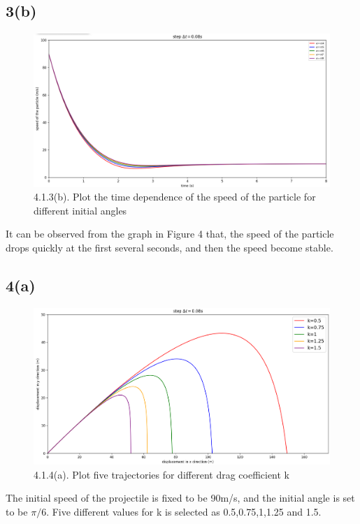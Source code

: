 \documentclass{article}
\begin{document}
\newpage
\subsection*{3(b)}
\begin{figure}[H]
  \centering
  \includegraphics[scale=0.4]{./graphs/project4.1.3(b).png}
  \caption{4.1.3(b). Plot the time dependence of the speed of the particle for different initial angles}
\end{figure}
It can be observed from the graph in Figure 4 that, the speed of the particle drops quickly at the first several seconds, and then the speed become stable.

\vspace{0.03\textheight}
\subsection*{4(a)}
\begin{figure}[H]
  \centering
  \includegraphics[scale=0.4]{./graphs/project4.1.4(a).png}
  \caption{4.1.4(a). Plot five trajectories for different drag coefficient k}
\end{figure}
\vspace{0.01\textheight}
The initial speed of the projectile is fixed to be 90m/s, and the initial angle is set to be $\pi/6$. Five different values for k is selected as 0.5,0.75,1,1.25 and 1.5.
\end{document}
